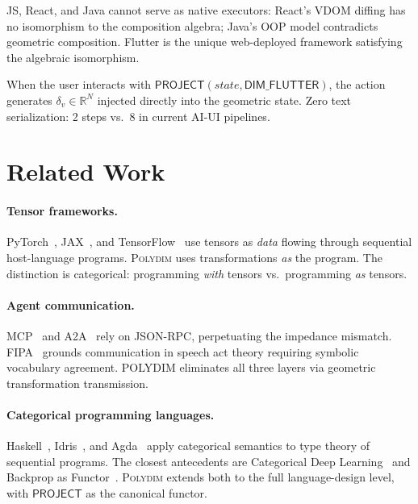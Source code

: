 \documentclass[10pt,twocolumn]{article}
\theoremstyle{plain}
\theoremstyle{definition}
\theoremstyle{remark}
\newcommand{\RR}{\mathbb{R}}
\newcommand{\Project}{\mathsf{PROJECT}}
\begin{document}
JS, React, and Java cannot serve as native executors: React's VDOM diffing has
no isomorphism to the composition algebra; Java's OOP model contradicts
geometric composition. Flutter is the unique web-deployed framework satisfying
the algebraic isomorphism.

When the user interacts with $\Project(\mathit{state}, \mathsf{DIM\_FLUTTER})$,
the action generates $\delta_v \in \RR^N$ injected directly into the geometric
state. Zero text serialization: 2 steps vs.\ 8 in current AI-UI pipelines.

\section{Related Work}
\label{sec:related}

\paragraph{Tensor frameworks.}
PyTorch~\citep{paszke2019pytorch}, JAX~\citep{bradbury2018jax}, and
TensorFlow~\citep{abadi2016tensorflow} use tensors as \emph{data} flowing
through sequential host-language programs. \textsc{Polydim} uses transformations
\emph{as} the program. The distinction is categorical: programming \emph{with}
tensors vs.\ programming \emph{as} tensors.

\paragraph{Agent communication.}
MCP~\citep{anthropic2024mcp} and A2A~\citep{google2025a2a} rely on JSON-RPC,
perpetuating the impedance mismatch. FIPA~\citep{fipa2002} grounds communication
in speech act theory requiring symbolic vocabulary agreement. POLYDIM eliminates
all three layers via geometric transformation transmission.

\paragraph{Categorical programming languages.}
Haskell~\citep{jones2003haskell}, Idris~\citep{brady2013idris}, and
Agda~\citep{norell2009agda} apply categorical semantics to type theory of
sequential programs. The closest antecedents are Categorical Deep
Learning~\citep{gavranovic2024categorical} and Backprop as
Functor~\citep{fong2019backprop}. \textsc{Polydim} extends both to the full
language-design level, with $\Project$ as the canonical functor.
\end{document}
